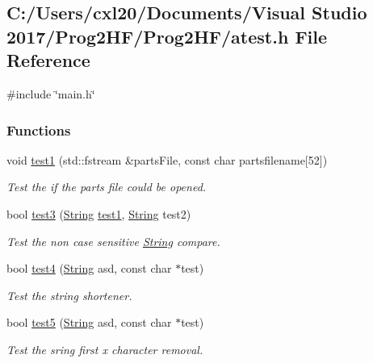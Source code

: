 \subsection{C\+:/\+Users/cxl20/\+Documents/\+Visual Studio 2017/\+Prog2\+H\+F/\+Prog2\+H\+F/atest.h File Reference}
\label{atest_8h}
{\ttfamily \#include \char`\"{}main.\+h\char`\"{}}\newline
\subsubsection*{Functions}
\begin{DoxyCompactItemize}
\item 
void \mbox{\hyperlink{atest_8h_a377b49f7a65ef678441feafbbb111fd0}{test1}} (std\+::fstream \&parts\+File, const char partsfilename\mbox{[}52\mbox{]})
\begin{DoxyCompactList}\small\item\em Test the if the parts file could be opened. \end{DoxyCompactList}\item 
bool \mbox{\hyperlink{atest_8h_a6e6df2af48d16780853d6eddcb8c8bc4}{test3}} (\mbox{\hyperlink{class_string}{String}} \mbox{\hyperlink{atest_8h_a377b49f7a65ef678441feafbbb111fd0}{test1}}, \mbox{\hyperlink{class_string}{String}} test2)
\begin{DoxyCompactList}\small\item\em Test the non case sensitive \mbox{\hyperlink{class_string}{String}} compare. \end{DoxyCompactList}\item 
bool \mbox{\hyperlink{atest_8h_ab545ece7a108a6470a3dc2161ba0008b}{test4}} (\mbox{\hyperlink{class_string}{String}} asd, const char $\ast$test)
\begin{DoxyCompactList}\small\item\em Test the string shortener. \end{DoxyCompactList}\item 
bool \mbox{\hyperlink{atest_8h_a07323edca3eb4730f312846bd8714d4a}{test5}} (\mbox{\hyperlink{class_string}{String}} asd, const char $\ast$test)
\begin{DoxyCompactList}\small\item\em Test the sring first x character removal. \end{DoxyCompactList}\end{DoxyCompactItemize}


